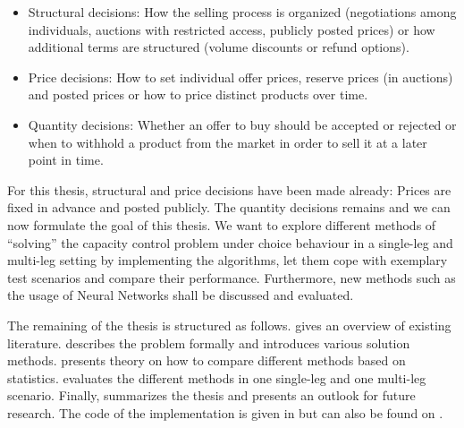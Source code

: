 \begin{itemize}
	\item Structural decisions: How the selling process is organized (\eg negotiations among individuals, auctions with restricted access, publicly posted prices) or how additional terms are structured (\eg volume discounts or refund options).
	\item Price decisions: How to set individual offer prices, reserve prices (in auctions) and posted prices or how to price distinct products over time.
	\item Quantity decisions: Whether an offer to buy should be accepted or rejected or when to withhold a product from the market in order to sell it at a later point in time.
\end{itemize}

For this thesis, structural and price decisions have been made already: Prices are fixed in advance and posted publicly. The quantity decisions remains and we can now formulate the goal of this thesis. We want to explore different methods of \enquote{solving} the capacity control problem under choice behaviour in a single-leg and multi-leg setting by implementing the algorithms, let them cope with exemplary test scenarios and compare their performance. Furthermore, new methods such as the usage of Neural Networks shall be discussed and evaluated. 

The remaining of the thesis is structured as follows. 
 gives an overview of existing literature.
 describes the problem formally and introduces various solution methods.
 presents theory on how to compare different methods based on statistics.
 evaluates the different methods in one single-leg and one multi-leg scenario.
Finally,  summarizes the thesis and presents an outlook for future research. The code of the implementation is given in  but can also be found on .

